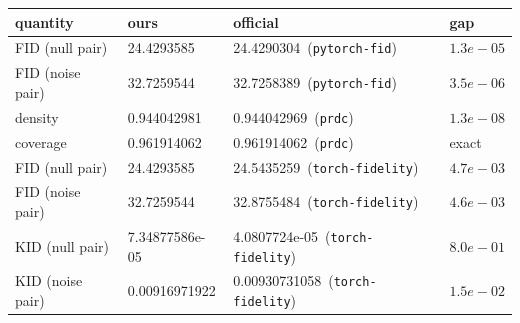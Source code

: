 \begin{tabular}{llll}
\toprule
quantity & ours & official & gap \\
\midrule
FID (null pair) & 24.4293585 & 24.4290304~(\texttt{pytorch-fid}) & $1.3e-05$ \\
FID (noise pair) & 32.7259544 & 32.7258389~(\texttt{pytorch-fid}) & $3.5e-06$ \\
density & 0.944042981 & 0.944042969~(\texttt{prdc}) & $1.3e-08$ \\
coverage & 0.961914062 & 0.961914062~(\texttt{prdc}) & exact \\
FID (null pair) & 24.4293585 & 24.5435259~(\texttt{torch-fidelity}) & $4.7e-03$ \\
FID (noise pair) & 32.7259544 & 32.8755484~(\texttt{torch-fidelity}) & $4.6e-03$ \\
KID (null pair) & 7.34877586e-05 & 4.0807724e-05~(\texttt{torch-fidelity}) & $8.0e-01$ \\
KID (noise pair) & 0.00916971922 & 0.00930731058~(\texttt{torch-fidelity}) & $1.5e-02$ \\
\bottomrule
\end{tabular}
